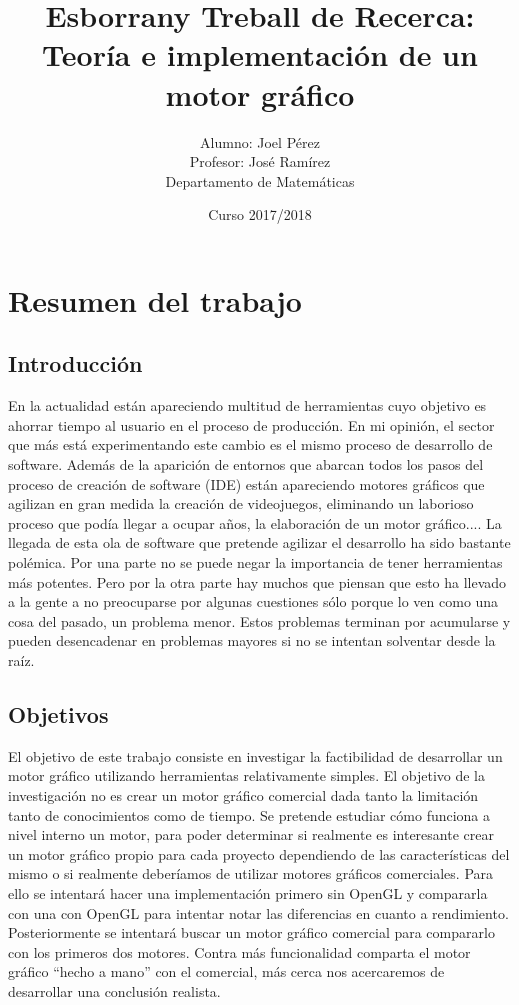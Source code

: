 \documentclass{article}
\title{Esborrany Treball de Recerca:\\Teoría e implementación de un motor gráfico}
\date{Curso 2017/2018}
\author{Alumno: Joel Pérez\\Profesor: José Ramírez\\Departamento de Matemáticas}
\begin{document}

\maketitle


\newpage


\tableofcontents

\newpage



\section{Resumen del trabajo}
\subsection{Introducción}
En la actualidad están apareciendo multitud de herramientas cuyo objetivo es ahorrar tiempo al usuario en el proceso de producción. En mi opinión, el sector que más está experimentando este cambio es el mismo proceso de desarrollo de software. Además de la aparición de entornos que abarcan todos los pasos del proceso de creación de software (IDE) están apareciendo motores gráficos que agilizan en gran medida la creación de videojuegos, eliminando un laborioso proceso que podía llegar a ocupar años, la elaboración de un motor gráfico....
\newline
La llegada de esta ola de software que pretende agilizar el desarrollo ha sido bastante polémica. Por una parte no se puede negar la importancia de tener herramientas más potentes. Pero por la otra parte hay muchos que piensan que esto ha llevado a la gente a no preocuparse por algunas cuestiones sólo porque lo ven como una cosa del pasado, un problema menor. Estos problemas terminan por acumularse y pueden desencadenar en problemas mayores si no se intentan solventar desde la raíz.
\subsection{Objetivos}
El objetivo de este trabajo consiste en investigar la factibilidad de desarrollar un motor gráfico utilizando herramientas relativamente simples. El objetivo de la investigación no es crear un motor gráfico comercial dada tanto la limitación tanto de conocimientos como de tiempo. Se pretende estudiar cómo funciona a nivel interno un motor, para poder determinar si realmente es interesante crear un motor gráfico propio para cada proyecto dependiendo de las características del mismo o si realmente deberíamos de utilizar motores gráficos comerciales.
\newline
Para ello se intentará hacer una implementación primero sin OpenGL y compararla con una con OpenGL para intentar notar las diferencias en cuanto a rendimiento. Posteriormente se intentará buscar un motor gráfico comercial para compararlo con los primeros dos motores. Contra más funcionalidad comparta el motor gráfico ``hecho a mano'' con el comercial, más cerca nos acercaremos de desarrollar una conclusión realista.
\end{document}
